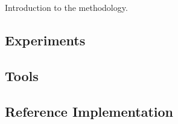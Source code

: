 Introduction to the methodology.

\subsection{Experiments}

\subsection{Tools}
\subsection{Reference Implementation}